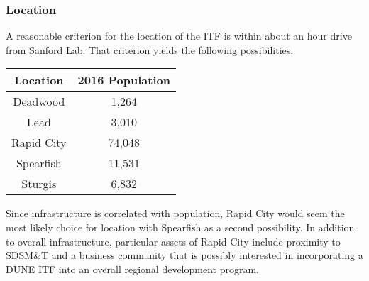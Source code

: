 \subsubsection{Location }
A reasonable criterion for the location of the ITF is within about an
hour drive from Sanford Lab. That criterion yields the following
possibilities.
\begin{center}
\begin{tabular}{ |c|c| } \hline
{\bf Location} & {\bf 2016 Population}  \\ \hline 
Deadwood & 1,264  \\ 
Lead & 3,010  \\
Rapid City & 74,048  \\
Spearfish & 11,531  \\
Sturgis & 6,832  \\ \hline
\end{tabular}
\end{center}
Since infrastructure is correlated with population, Rapid City would seem the most likely
choice for location with Spearfish as a second possibility. In addition to overall infrastructure,
particular assets of Rapid City include proximity to SDSM\&T and a business community that is
possibly interested in incorporating a DUNE ITF into an overall regional development
program.

